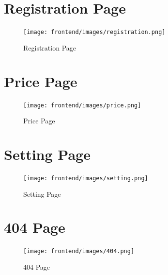 \documentclass{article}
\begin{document}
\noindent \section{Registration Page }

\begin{figure}[h]
\centering
\texttt{[image: frontend/images/registration.png]}
\caption{Registration Page}
\end{figure}

\noindent 
\newpage

\noindent \section{Price Page }

\begin{figure}[h]
\centering
\texttt{[image: frontend/images/price.png]}
\caption{Price Page}
\end{figure}

\noindent 
\newpage

\noindent \section{Setting Page }

\begin{figure}[h]
\centering
\texttt{[image: frontend/images/setting.png]}
\caption{Setting Page}
\end{figure}

\noindent 
\newpage

\noindent \section{404 Page }

\begin{figure}[h]
\centering
\texttt{[image: frontend/images/404.png]}
\caption{404 Page}
\end{figure}

\noindent 
\end{document}
